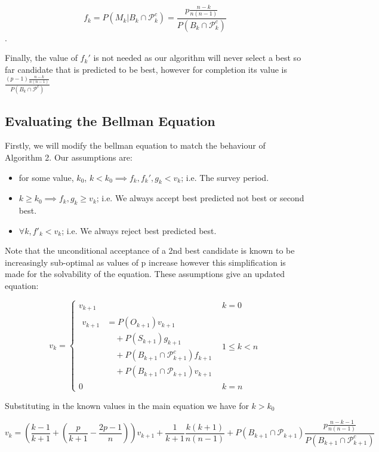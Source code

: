 \documentclass[a4paper,11pt]{article}
\begin{document}
$$
f_k=P(M_k| B_k\cap \mathcal{P}^c_k ) = \frac{p\frac{n-k}{n(n-1)}}{P(B_k\cap \mathcal{P}^c_k)}
$$.

Finally, the value of $f_k'$ is not needed as our algorithm will never select a best so far candidate that is predicted to be best, however for completion its value is $\frac{(p-1)\frac{n-k}{n(n-1)}}{P(B_k\cap \mathcal{P}^c)}$
\subsection{Evaluating the Bellman Equation}
\label{sec:ninetwo}
Firstly, we will modify the bellman equation to match the behaviour of Algorithm 2. Our assumptions are:
\begin{itemize}
    \item for some value, $k_0$, $k < {k_0} \implies f_k, f_k', g_k < v_k$; i.e. The survey period.
    \item $k \ge k_0 \implies f_k, g_k \ge v_k$; i.e. We always accept best predicted not best or second best.
    \item $\forall k, f'_k<v_k$; i.e. We always reject best predicted best.
\end{itemize}

Note that the unconditional acceptance of a 2nd best candidate is known to be increasingly sub-optimal as values of p increase however this simplification is made for the solvability of the equation. These assumptions give an updated equation:

$$
v_k = \begin{cases}
  v_{k+1} & k = 0\\
\begin{aligned}
v_{k+1} &= P(O_{k+1}) v_{k+1} \\
      &\quad + P(S_{k+1})g_{k+1} \\
      &\quad + P(B_{k+1} \cap \mathcal{P}_{k+1}^c)f_{k+1} \\
      &\quad + P(B_{k+1} \cap \mathcal{P}_{k+1})v_{k+1}
\end{aligned} & 1\le k < n\\
 0 & k = n
\end{cases}
$$

Substituting in the known values in the main equation we have for $k> k_0$

$$
v_k=\left(\frac{k-1}{k+1} + (\frac{p}{k+1} - \frac{2p-1}{n})\right)v_{k+1} + \frac{1}{k+1}\frac{k(k+1)}{n(n-1)} + P(B_{k+1} \cap \mathcal{P}_{k+1})\frac{p\frac{n-k-1}{n(n-1)}}{P(B_{k+1}\cap \mathcal{P}^c_{k+1})}
$$
\end{document}
